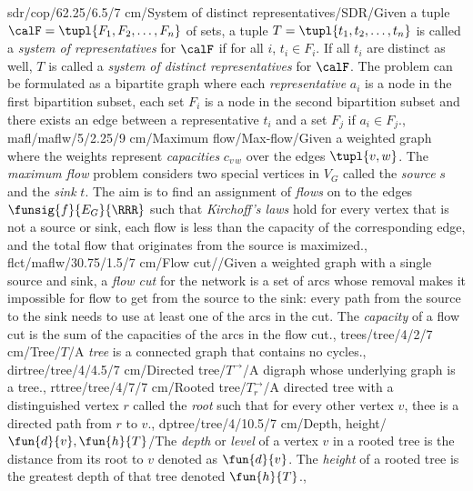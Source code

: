 sdr/cop/62.25/6.5/7 cm/{System of distinct representatives}/{SDR}/{Given a tuple $\calF=\tupl{F_1,F_2,\ldots,F_n}$ of sets, a tuple $T=\tupl{t_1,t_2,\ldots,t_n}$ is called a \emph{system of representatives} for $\calF$ if for all $i$, $t_i\in F_i$. If all $t_i$ are distinct as well, $T$ is called a \emph{system of distinct representatives} for $\calF$. The problem can be formulated as a bipartite graph where each \emph{representative} $a_i$ is a node in the first bipartition subset, each set $F_i$ is a node in the second bipartition subset and there exists an edge between a representative $t_i$ and a set $F_j$ if $a_i\in F_j$.},
mafl/maflw/5/2.25/9 cm/{Maximum flow}/{Max-flow}/{Given a weighted graph where the weights represent \emph{capacities} $c_{v\,w}$ over the edges $\tupl{v,w}$. The \emph{maximum flow} problem considers two special vertices in $V_G$ called the \emph{source} $s$ and the \emph{sink} $t$. The aim is to find an assignment of \emph{flows} on to the edges $\funsig{f}{E_G}{\RRR}$ such that \emph{Kirchoff's laws} hold for every vertex that is not a source or sink, each flow is less than the capacity of the corresponding edge, and the total flow that originates from the source is maximized.},
flct/maflw/30.75/1.5/7 cm/{Flow cut}/{\watertap\Leftscissors}/{Given a weighted graph with a single source and sink, a \emph{flow cut} for the network is a set of arcs whose removal makes it impossible for flow to get from the source to the sink: every path from the source to the sink needs to use at least one of the arcs in the cut. The \emph{capacity} of a flow cut is the sum of the capacities of the arcs in the flow cut.},
trees/tree/4/2/7 cm/Tree/$T$/{A \emph{tree} is a connected graph that contains no cycles.},%
dirtree/tree/4/4.5/7 cm/{Directed tree}/{$T^{\rightarrow}$}/{A digraph whose underlying graph is a tree.},%
rttree/tree/4/7/7 cm/{Rooted tree}/{$T^{\rightarrow}_r$}/{A directed tree with a distinguished vertex $r$ called the \emph{root} such that for every other vertex $v$, thee is a directed path from $r$ to $v$.},%
dptree/tree/4/10.5/7 cm/{Depth, height}/{$\fun{d}{v},\fun{h}{T}$}/{The \emph{depth} or \emph{level} of a vertex $v$ in a rooted tree is the distance from its root to $v$ denoted as $\fun{d}{v}$. The \emph{height} of a rooted tree is the greatest depth of that tree denoted $\fun{h}{T}$.},%
